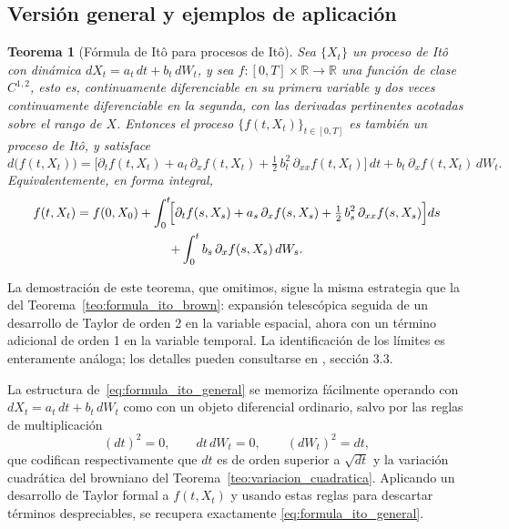 \documentclass[11pt,a4paper,oneside]{report}
\theoremstyle{plain}
\newtheorem{teorema}{Teorema}[chapter]
\theoremstyle{definition}
\theoremstyle{remark}
\newcommand{\R}{\mathbb{R}}
\newcommand{\1}{\mathbf{1}}
\begin{document}
\medskip

\subsection{Versión general y ejemplos de aplicación}
\label{subsec:formula_ito_general}

\medskip

\begin{teorema}[Fórmula de Itô para procesos de Itô]
\label{teo:formula_ito_general}
Sea $\{X_t\}$ un proceso de Itô con dinámica $dX_t = a_t\, dt + b_t\,
dW_t$, y sea $f : [0, T] \times \R \to \R$ una función de clase
$C^{1,2}$, esto es, continuamente diferenciable en su primera
variable y dos veces continuamente diferenciable en la segunda, con
las derivadas pertinentes acotadas sobre el rango de $X$. Entonces el
proceso $\{f(t, X_t)\}_{t \in [0, T]}$ es también un proceso de Itô,
y satisface
\begin{equation}\label{eq:formula_ito_general}
  d\bigl(f(t, X_t)\bigr)
  = \biggl[\partial_t f(t, X_t) + a_t\, \partial_x f(t, X_t)
           + \tfrac{1}{2}\, b_t^2\, \partial_{xx} f(t, X_t)\biggr]\, dt
   + b_t\, \partial_x f(t, X_t)\, dW_t.
\end{equation}
Equivalentemente, en forma integral,
\begin{multline*}
  f(t, X_t) = f(0, X_0)
      + \int_0^t \!\Bigl[\partial_t f(s, X_s) + a_s\, \partial_x f(s, X_s)
                          + \tfrac{1}{2}\, b_s^2\, \partial_{xx} f(s, X_s)\Bigr]
                          ds \\
      + \int_0^t b_s\, \partial_x f(s, X_s)\, dW_s.
\end{multline*}
\end{teorema}

La demostración de este teorema, que omitimos, sigue la misma
estrategia que la del Teorema~\ref{teo:formula_ito_brown}: expansión
telescópica seguida de un desarrollo de Taylor de orden 2 en la variable
espacial, ahora con un término adicional de orden 1 en la variable
temporal. La identificación de los límites es enteramente análoga; los
detalles pueden consultarse en \cite{karatzas-shreve}, sección 3.3.

La estructura
de~\eqref{eq:formula_ito_general} se memoriza fácilmente operando con
$dX_t = a_t\, dt + b_t\, dW_t$ como con un objeto diferencial
ordinario, salvo por las reglas de multiplicación
\begin{equation}\label{eq:reglas_ito}
  (dt)^2 = 0, \qquad dt\, dW_t = 0, \qquad (dW_t)^2 = dt,
\end{equation}
que codifican respectivamente que $dt$ es de orden superior a
$\sqrt{dt}$ y la variación cuadrática del browniano del
Teorema~\ref{teo:variacion_cuadratica}. Aplicando un desarrollo de
Taylor formal a $f(t, X_t)$ y usando estas reglas para descartar
términos despreciables, se recupera exactamente
\eqref{eq:formula_ito_general}.
\end{document}
